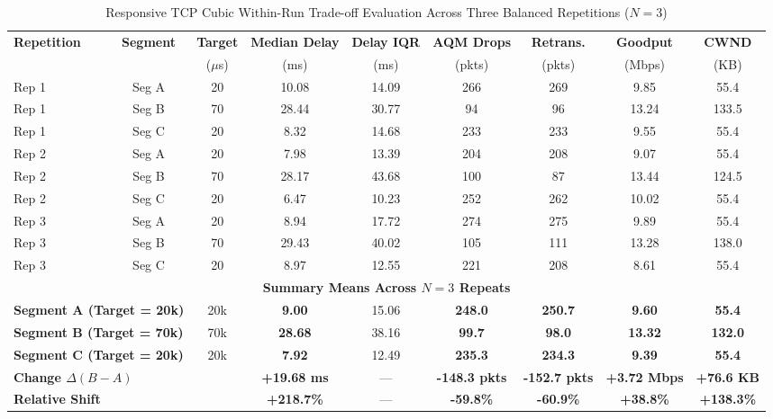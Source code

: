 \begin{table}[H]
\centering
\small
\caption{Responsive TCP Cubic Within-Run Trade-off Evaluation Across Three Balanced Repetitions ($N=3$)}
\label{tab:tcp_tradeoff}
\begin{tabularx}{\textwidth}{lcccccccc}
\toprule
\textbf{Repetition} & \textbf{Segment} & \textbf{Target} & \textbf{Median Delay} & \textbf{Delay IQR} & \textbf{AQM Drops} & \textbf{Retrans.} & \textbf{Goodput} & \textbf{CWND} \\
 & & ($\mu$s) & (ms) & (ms) & (pkts) & (pkts) & (Mbps) & (KB) \\
\midrule
Rep 1 & Seg A & 20 & 10.08 & 14.09 & 266 & 269 & 9.85 & 55.4 \\
Rep 1 & Seg B & 70 & 28.44 & 30.77 & 94 & 96 & 13.24 & 133.5 \\
Rep 1 & Seg C & 20 & 8.32 & 14.68 & 233 & 233 & 9.55 & 55.4 \\
\midrule
Rep 2 & Seg A & 20 & 7.98 & 13.39 & 204 & 208 & 9.07 & 55.4 \\
Rep 2 & Seg B & 70 & 28.17 & 43.68 & 100 & 87 & 13.44 & 124.5 \\
Rep 2 & Seg C & 20 & 6.47 & 10.23 & 252 & 262 & 10.02 & 55.4 \\
\midrule
Rep 3 & Seg A & 20 & 8.94 & 17.72 & 274 & 275 & 9.89 & 55.4 \\
Rep 3 & Seg B & 70 & 29.43 & 40.02 & 105 & 111 & 13.28 & 138.0 \\
Rep 3 & Seg C & 20 & 8.97 & 12.55 & 221 & 208 & 8.61 & 55.4 \\
\midrule
\multicolumn{9}{c}{\textbf{Summary Means Across $N=3$ Repeats}} \\
\multicolumn{2}{l}{\textbf{Segment A (Target = 20k)}} & 20k & \textbf{9.00} & 15.06 & \textbf{248.0} & \textbf{250.7} & \textbf{9.60} & \textbf{55.4} \\
\multicolumn{2}{l}{\textbf{Segment B (Target = 70k)}} & 70k & \textbf{28.68} & 38.16 & \textbf{99.7} & \textbf{98.0} & \textbf{13.32} & \textbf{132.0} \\
\multicolumn{2}{l}{\textbf{Segment C (Target = 20k)}} & 20k & \textbf{7.92} & 12.49 & \textbf{235.3} & \textbf{234.3} & \textbf{9.39} & \textbf{55.4} \\
\midrule
\multicolumn{3}{l}{\textbf{Change $\Delta(B - A)$}} & \textbf{+19.68 ms} & --- & \textbf{-148.3 pkts} & \textbf{-152.7 pkts} & \textbf{+3.72 Mbps} & \textbf{+76.6 KB} \\
\multicolumn{3}{l}{\textbf{Relative Shift}} & \textbf{+218.7\%} & --- & \textbf{-59.8\%} & \textbf{-60.9\%} & \textbf{+38.8\%} & \textbf{+138.3\%} \\
\bottomrule
\end{tabularx}
\end{table}
